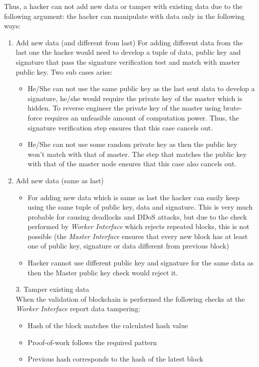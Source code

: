 \documentclass[10pt,journal,compsoc]{IEEEtran}
\begin{document}
Thus, a hacker can not add new data or tamper with existing data due to the following argument:
the hacker can manipulate with data only in the following ways:
\begin{enumerate}
\item Add new data (and different from last)
For adding different data from the last one the hacker would need to develop a tuple of data, public key and signature that pass the signature verification test and match with master public key. Two sub cases arise:
\begin{itemize}
\item He/She can not use the same public key as the last sent data to develop a signature, he/she would require the private key of the master which is hidden. To reverse engineer the private key of the master using brute-force requires an unfeasible amount of computation power. Thus, the signature verification step ensures that this case cancels out.
\item He/She can not use some random private key as then the public key won’t match with that of master. The step that matches the public key with that of the master node ensures that this case also cancels out. 
\end{itemize}
\item Add new data (same as last)
\begin{itemize}
\item For adding new data which is same as last the hacker can easily keep using the same tuple of public key, data and signature. This is very much probable for causing deadlocks and DDoS attacks, but due to the check performed by \textit{Worker Interface} which rejects repeated blocks, this is not possible (the \textit{Master Interface }ensures that every new block has at least one of public key, signature or data different from previous block)
\item Hacker cannot use different public key and signature for the same data as then the Master public key check would reject it.
\end{itemize}
3.	Tamper existing data \\
When the validation of blockchain is performed the following checks at the \textit{Worker Interface} report data tampering:
\begin{itemize}
\item Hash of the block matches the calculated hash value
\item Proof-of-work follows the required pattern
\item Previous hash corresponds to the hash of the latest block 
\end{itemize}
\end{enumerate}
\end{document}
